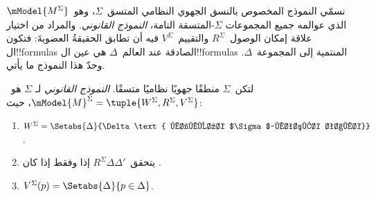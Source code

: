 \documentclass[../../../include/open-logic-section]{subfiles}
\begin{document}


نسمّي النموذج المخصوص بالنسق الجهوي النظامي المتسق~$\Sigma$،
وهو~$\mModel{M^\Sigma}$ الذي عوالمه جميع المجموعات
$\Sigma$-المتسقة التامة، \emph{النموذج القانوني}.
والمراد من اختيار علاقة إمكان الوصول~$R^\Sigma$ والتقييم~$V^\Sigma$
فيه أن تطابق الحقيقةُ العضويةَ: فتكون ال!!{formula}s الصادقة
عند العالم~$\Delta$ هي عين ال!!{formula}s المنتمية إلى المجموعة~$\Delta$.
وحدّ هذا النموذج ما يأتي.

\begin{defn}
  لتكن~$\Sigma$ منطقًا جهويًا نظاميًا متسقًا. \emph{النموذج القانوني} لـ
  $\Sigma$ هو~$\mModel{M}^\Sigma = \tuple{W^\Sigma, R^\Sigma,
    V^\Sigma}$، حيث:
  \begin{enumerate}
  \item $W^\Sigma = \Setabs{\Delta}{\Delta \text{ مجموعة
      $\Sigma$-متسقة تامة}}$.
  \item يتحقق~$R^\Sigma \Delta\Delta'$ إذا وفقط إذا كان
    .
  \item $V^\Sigma(p) = \Setabs{\Delta}{p \in \Delta}$.
  \end{enumerate}
\end{defn}
\end{document}
